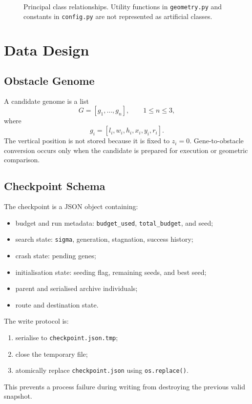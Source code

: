 \documentclass[11pt,a4paper]{report}
\newcommand{\code}[1]{\texttt{#1}}
\begin{document}
\begin{figure}[H]
{%
}
\caption{Principal class relationships. Utility functions in \code{geometry.py} and constants in \code{config.py} are not represented as artificial classes.}
\label{fig:classes}
\end{figure}

\section{Data Design}

\subsection{Obstacle Genome}
A candidate genome is a list
\[
G=\left[g_1,\ldots,g_n\right],\qquad 1\le n\le 3,
\]
where
\[
g_i=[l_i,w_i,h_i,x_i,y_i,r_i].
\]
The vertical position is not stored because it is fixed to $z_i=0$. Gene-to-obstacle conversion occurs only when the candidate is prepared for execution or geometric comparison.

\subsection{Checkpoint Schema}
The checkpoint is a JSON object containing:
\begin{itemize}
  \item budget and run metadata: \code{budget\_used}, \code{total\_budget}, and seed;
  \item search state: \code{sigma}, generation, stagnation, success history;
  \item crash state: pending genes;
  \item initialisation state: seeding flag, remaining seeds, and best seed;
  \item parent and serialised archive individuals;
  \item route and destination state.
\end{itemize}

The write protocol is:
\begin{enumerate}
  \item serialise to \code{checkpoint.json.tmp};
  \item close the temporary file;
  \item atomically replace \code{checkpoint.json} using \code{os.replace()}.
\end{enumerate}
This prevents a process failure during writing from destroying the previous valid snapshot.
\end{document}
